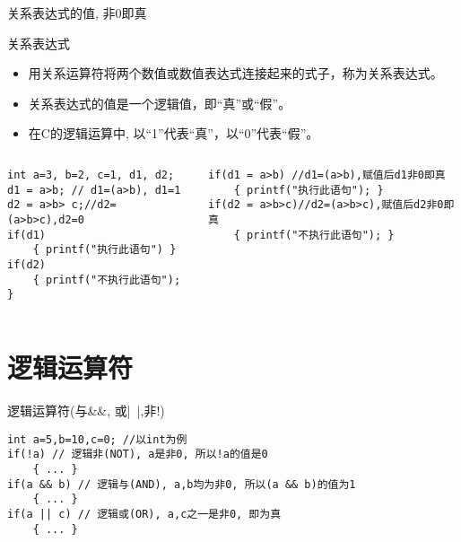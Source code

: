 \begin{frame}{关系表达式的值, 非0即真}
\begin{block}{关系表达式}
	\small
	\begin{itemize}
		\item 用关系运算符将两个数值或数值表达式连接起来的式子，称为关系表达式。
		\item 关系表达式的值是一个逻辑值，即``真''或``假''。
		\item 在C的逻辑运算中, 以``1''代表``真''，以``0''代表``假''。	
	\end{itemize}
\end{block}
\vspace{-0.5cm}
\begin{columns}[T]
\begin{lstlisting}
int a=3, b=2, c=1, d1, d2; 
d1 = a>b; // d1=(a>b), d1=1
d2 = a>b> c;//d2=(a>b>c),d2=0
if(d1)
	{ printf("执行此语句") }
if(d2) 
	{ printf("不执行此语句"); }
\end{lstlisting}
\begin{lstlisting}
if(d1 = a>b) //d1=(a>b),赋值后d1非0即真
	{ printf("执行此语句"); }
if(d2 = a>b>c)//d2=(a>b>c),赋值后d2非0即真
	{ printf("不执行此语句"); }
\end{lstlisting}
\end{columns}
\end{frame}

\section{逻辑运算符}

\begin{frame}{逻辑运算符(与\&\&, 或|~|,非!)}
\begin{lstlisting}
int a=5,b=10,c=0; //以int为例
if(!a) // 逻辑非(NOT), a是非0, 所以!a的值是0
	{ ... }
if(a && b) // 逻辑与(AND), a,b均为非0, 所以(a && b)的值为1
	{ ... }
if(a || c) // 逻辑或(OR), a,c之一是非0, 即为真
	{ ... }
\end{lstlisting}
\end{frame}

